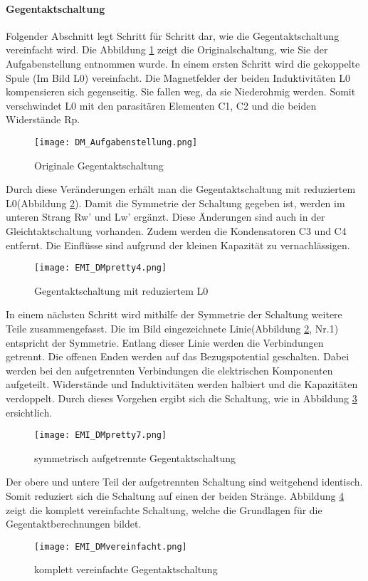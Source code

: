 \paragraph{Gegentaktschaltung}\label{para:zusammenfassungGegentakt}
Folgender Abschnitt legt Schritt für Schritt dar, wie die Gegentaktschaltung vereinfacht wird. Die Abbildung \ref{fig:DMSchaltungAufgabenstellung} zeigt die Originalschaltung, wie Sie der Aufgabenstellung entnommen wurde. In einem ersten Schritt wird die gekoppelte Spule (Im Bild L0) vereinfacht. Die Magnetfelder der beiden Induktivitäten L0 kompensieren sich gegenseitig. Sie fallen weg, da sie Niederohmig werden. Somit verschwindet L0 mit den parasitären Elementen C1, C2 und die beiden Widerstände Rp.
\begin{figure}[H]
	\centering
	\texttt{[image: DM\_Aufgabenstellung.png]}
	\caption{Originale Gegentaktschaltung}
	\label{fig:DMSchaltungAufgabenstellung}
\end{figure}
Durch diese Veränderungen erhält man die Gegentaktschaltung mit reduziertem L0(Abbildung \ref{fig:DMSchaltungreduziertL0}). Damit die Symmetrie der Schaltung gegeben ist, werden im unteren Strang Rw’ und Lw’ ergänzt. Diese Änderungen sind auch in der Gleichtaktschaltung vorhanden. Zudem werden die Kondensatoren C3 und C4 entfernt. Die Einflüsse sind aufgrund der kleinen Kapazität zu vernachlässigen. 
\begin{figure}[H]
	\centering
	\texttt{[image: EMI\_DMpretty4.png]}
	\caption{Gegentaktschaltung mit reduziertem L0}
	\label{fig:DMSchaltungreduziertL0}
\end{figure}
In einem nächsten Schritt wird mithilfe der Symmetrie der Schaltung weitere Teile zusammengefasst. Die im Bild eingezeichnete Linie(Abbildung \ref{fig:DMSchaltungreduziertL0}, Nr.1) entspricht der Symmetrie. Entlang dieser Linie werden die Verbindungen getrennt. Die offenen Enden werden auf das Bezugspotential geschalten. Dabei werden bei den aufgetrennten Verbindungen die elektrischen Komponenten aufgeteilt. Widerstände und Induktivitäten werden halbiert und die Kapazitäten verdoppelt. Durch dieses Vorgehen ergibt sich die Schaltung, wie in Abbildung \ref{fig:DMSchaltungSymAufgetrennt} ersichtlich.
\begin{figure}[H]
	\centering
	\texttt{[image: EMI\_DMpretty7.png]}
	\caption{symmetrisch aufgetrennte Gegentaktschaltung}
	\label{fig:DMSchaltungSymAufgetrennt}
\end{figure}
Der obere und untere Teil der aufgetrennten Schaltung sind weitgehend identisch. Somit reduziert sich die Schaltung auf einen der beiden Stränge. Abbildung \ref{fig:DMSchaltungvereinfacht} zeigt die komplett vereinfachte Schaltung, welche die Grundlagen für die Gegentaktberechnungen bildet. 
\begin{figure}[H]
	\centering
	\texttt{[image: EMI\_DMvereinfacht.png]}
	\caption{komplett vereinfachte Gegentaktschaltung}
	\label{fig:DMSchaltungvereinfacht}
\end{figure}


